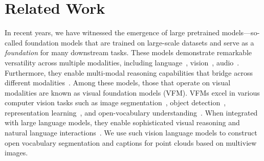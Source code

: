 \section{Related Work}
\label{sec:related}


In recent years, we have witnessed the emergence of large pretrained models—so-called foundation models that are trained on large-scale datasets and serve as a \textit{foundation} for many downstream tasks.
These models demonstrate remarkable versatility across multiple modalities, including language~\cite{team2023gemini,touvron2023llama,touvron2023llama2,dubey2024llama3,vicuna2023,radford2019language,brown2020language,chung2024scaling,achiam2023gpt,bai2023qwen,yang2024qwen2,jiang2023mistral,jiang2024mixtral}, vision~\cite{sam,ravi2024sam,dino_v1,oquab2023dinov2,zou2024segment,rombach2022high,ho2020denoising,nichol2021improved,songdenoising,songscore}, audio~\cite{deshmukh2023pengi,zhang2023speechgpt,rubenstein2023audiopalm,borsos2023audiolm}. 
Furthermore, they enable multi-modal reasoning capabilities that bridge across different modalities~\cite{girdharImageBindOneEmbedding2023,Qwen-VL,llava,radfordLearningTransferableVisual2021,jia2021scaling,team2024gemini}.
Among these models, those that operate on visual modalities are known as visual foundation models (VFM).
VFMs excel in various computer vision tasks such as image segmentation~\cite{sam,ravi2024sam,zou2024segment,zou2023generalized,cheng2021per,cheng2022masked,jain2023oneformer,li2024semantic}, object detection~\cite{liu2023grounding,carion2020end}, representation learning~\cite{dino_v1,oquab2023dinov2}, and open-vocabulary understanding~\cite{radfordLearningTransferableVisual2021,li2022language,ghiasi2022scaling,ram,ram_pp,yu2023convolutions,kang2024defense,naeem2024silc,cho2024cat}.
When integrated with large language models, they enable sophisticated visual reasoning and natural language interactions~\cite{llava,Qwen-VL,girdharImageBindOneEmbedding2023,team2024gemini,guo2024regiongpt,yuan2024osprey,you2023ferret}.
We use such vision language models to construct open vocabulary segmentation and captions for point clouds based on multiview images.







